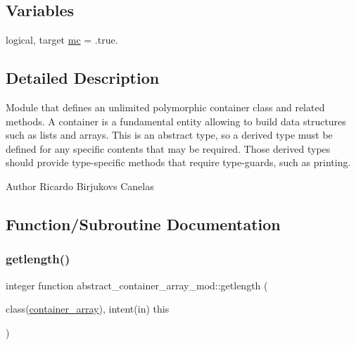\subsection*{Variables}
\begin{DoxyCompactItemize}
\item 
logical, target \mbox{\hyperlink{namespaceabstract__container__array__mod_a536c39baa7114f8ddff2dec5a90a894e}{mc}} = .true.
\end{DoxyCompactItemize}


\subsection{Detailed Description}
Module that defines an unlimited polymorphic container class and related methods. A container is a fundamental entity allowing to build data structures such as lists and arrays. This is an abstract type, so a derived type must be defined for any specific contents that may be required. Those derived types should provide type-\/specific methods that require type-\/guards, such as printing. 

\begin{DoxyAuthor}{Author}
Ricardo Birjukovs Canelas 
\end{DoxyAuthor}


\subsection{Function/\+Subroutine Documentation}
\mbox{\label{namespaceabstract__container__array__mod_a22d71ca3f03bf0bb5d3737338e5e349a}} 
\subsubsection{\texorpdfstring{getlength()}{getlength()}}
{\footnotesize\ttfamily integer function abstract\+\_\+container\+\_\+array\+\_\+mod\+::getlength (\begin{DoxyParamCaption}\item[{class(\mbox{\hyperlink{structabstract__container__array__mod_1_1container__array}{container\+\_\+array}}), intent(in)}]{this }\end{DoxyParamCaption})\hspace{0.3cm}{\ttfamily [private]}}



